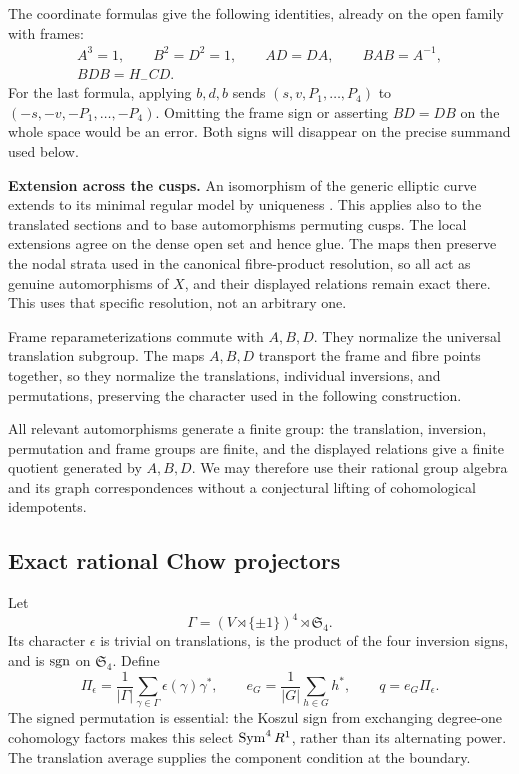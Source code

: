 The coordinate formulas give the following identities, already on the open
family with frames:
\[
\begin{gathered}
A^3=1,\qquad B^2=D^2=1,\qquad AD=DA,\qquad BAB=A^{-1},\\
\boxed{BDB=H_-CD.}
\end{gathered}
\]
For the last formula, applying $b,d,b$ sends
$(s,v,P_1,\ldots,P_4)$ to $(-s,-v,-P_1,\ldots,-P_4)$.
Omitting the frame sign or asserting $BD=DB$ on the whole space would be an
error. Both signs will disappear on the precise summand used below.

\textbf{Extension across the cusps.} An isomorphism of the generic elliptic
curve extends to its minimal regular model by uniqueness \cite{StacksMinimal}. This applies
also to the translated sections and to base automorphisms permuting cusps.
The local extensions agree on the dense open set and hence glue. The maps
then preserve the nodal strata used in the canonical fibre-product resolution,
so all act as genuine automorphisms of $X$, and their displayed relations
remain exact there. This uses that specific resolution, not an arbitrary one.

Frame reparameterizations commute with $A,B,D$. They normalize the universal
translation subgroup. The maps $A,B,D$ transport the frame and fibre points
together, so they normalize the translations, individual inversions, and
permutations, preserving the character used in the following construction.

All relevant automorphisms generate a finite group: the translation, inversion,
permutation and frame groups are finite, and the displayed relations give a
finite quotient generated by $A,B,D$. We may therefore use their rational
group algebra and its graph correspondences without a conjectural lifting of
cohomological idempotents.


\subsection{Exact rational Chow projectors}
Let
\[
\Gamma=(V\rtimes\{\pm1\})^4\rtimes\mathfrak S_4.
\]
Its character $\epsilon$ is trivial on translations, is the product of the
four inversion signs, and is $\operatorname{sgn}$ on $\mathfrak S_4$. Define
\[
\Pi_\epsilon=\frac1{|\Gamma|}\sum_{\gamma\in\Gamma}
\epsilon(\gamma)\gamma^*,\qquad
e_G=\frac1{|G|}\sum_{h\in G}h^*,\qquad q=e_G\Pi_\epsilon.
\]
The signed permutation is essential: the Koszul sign from exchanging degree-one
cohomology factors makes this select $\operatorname{Sym}^4 R^1$, rather than its alternating
power. The translation average supplies the component condition at the boundary.

